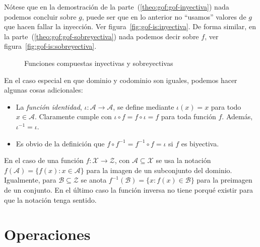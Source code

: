   Nótese que en la demostración de la parte~(\ref{theo:gof:gof-inyectiva})
  nada podemos concluir sobre \(g\),
  puede ser que en lo anterior no ``usamos'' valores de \(g\)
  que hacen fallar la inyección.
  Ver figura~\ref{fig:gof-is:inyectiva}.
  De forma similar,
  en la parte~(\ref{theo:gof:gof-sobreyectiva})
  nada podemos decir sobre \(f\),
  ver figura~\ref{fig:gof-is:sobreyectiva}.
  \begin{figure}[htbp]
    \centering
    \hspace{1in}
    \caption{Funciones compuestas inyectivas y sobreyectivas}
    \label{fig:gof-is}
  \end{figure}

  En el caso especial en que dominio y codominio son iguales,
  podemos hacer algunas cosas adicionales:
  \begin{itemize}
  \item
    La \emph{función identidad},%
    \(\iota \colon \mathcal{A} \rightarrow \mathcal{A}\),
    se define mediante \(\iota(x) = x\) para todo \(x \in \mathcal{A}\).
    Claramente cumple con \(\iota \circ f = f \circ \iota = f\)
    para toda función \(f\).
    Además,
    \(\iota^{-1} = \iota\).
  \item
    Es obvio de la definición que \(f \circ f^{-1} = f^{-1} \circ f = \iota\)
    si \(f\) es biyectiva.
  \end{itemize}

  En el caso de una función \(f \colon \mathcal{X} \rightarrow \mathcal{Z}\),
  con \(\mathcal{A} \subseteq \mathcal{X}\)
  se usa la notación
    \(f(\mathcal{A}) = \{f(x) \colon x \in \mathcal{A}\}\)
  para la imagen de un subconjunto del dominio.%
  Igualmente,
  para \(\mathcal{B} \subseteq \mathcal{Z}\)
  se anota \(f^{-1} (\mathcal{B}) = \{x \colon f(x) \in \mathcal{B}\}\)
  para la preimagen de un conjunto.%
  En el último caso la función inversa no tiene porqué existir
  para que la notación tenga sentido.

\section{Operaciones}
\label{sec:operaciones}


